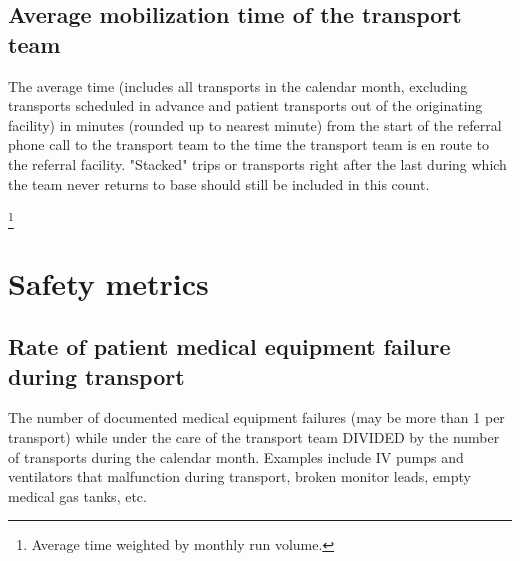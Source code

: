 \documentclass[twoside]{article}\usepackage[]{graphicx}\usepackage[]{color}
\makeatletter
\newenvironment{kframe}{%
 \def\at@end@of@kframe{}%
 \ifinner\ifhmode%
  \def\at@end@of@kframe{\end{minipage}}%
  \begin{minipage}{\columnwidth}%
 \fi\fi%
 \def\FrameCommand##1{\hskip\@totalleftmargin \hskip-\fboxsep
 \colorbox{shadecolor}{##1}\hskip-\fboxsep
     \hskip-\linewidth \hskip-\@totalleftmargin \hskip\columnwidth}%
 \MakeFramed {\advance\hsize-\width
   \@totalleftmargin\z@ \linewidth\hsize
   \@setminipage}}%
 {\par\unskip\endMakeFramed%
 \at@end@of@kframe}
\newenvironment{knitrout}{}{} %
\makeatother
\begin{document}
\begin{kframe}


{\ttfamily\noindent\bfseries{}}\end{kframe}

\newpage
\subsection{Average mobilization time of the transport team}
The average time (includes all transports in the calendar month, excluding transports scheduled in advance and patient transports out of the originating facility) in minutes (rounded up to nearest minute) from the start of the referral phone call to the transport team to the time the transport team is en route to the referral facility. "Stacked" trips or transports right after the last during which the team never returns to base should still be included in this count.

\let\thefootnote\relax\footnote{Average time weighted by monthly run volume.}

\begin{center}
\begin{knitrout}
\color{fgcolor}\begin{kframe}


{\ttfamily\noindent\bfseries\color{errorcolor}{\#\# Error: object 'timeData' not found}}\end{kframe}
\end{knitrout}
\end{center}






\newpage
\section{Safety metrics}
\subsection{Rate of patient medical equipment failure during transport}
The number of documented medical equipment failures (may be more than 1 per transport) while under the care of the transport team DIVIDED by the number of transports during the calendar month. Examples include IV pumps and ventilators that malfunction during transport, broken monitor leads, empty medical gas tanks, etc.
\end{document}
